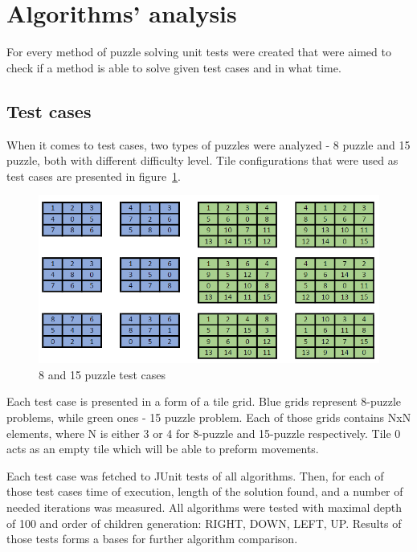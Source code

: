 \documentclass[12pt]{article}
\begin{document}
\section{Algorithms' analysis}

For every method of puzzle solving unit tests were created that were aimed to check if a method is able to solve given test cases and in what time.

\subsection {Test cases}

When it comes to test cases, two types of puzzles were analyzed - 8 puzzle and 15 puzzle, both with different difficulty level. Tile configurations that were used as test cases are presented in figure~\ref{puzzle-test}.

\begin{figure}[h]
    \includegraphics[width=\textwidth]{puzzle_test}
    \centering
    \caption{8 and 15 puzzle test cases}
    \label {puzzle-test}
\end{figure}

Each test case is presented in a form of a tile grid. Blue grids represent 8-puzzle problems, while green ones - 15 puzzle problem. Each of those grids contains NxN elements, where N is either 3 or 4 for 8-puzzle and 15-puzzle respectively. Tile 0 acts as an empty tile which will be able to preform movements. 

Each test case was fetched to JUnit tests of all algorithms. Then, for each of those test cases time of execution, length of the solution found, and a number of needed iterations was measured. All algorithms were tested with maximal depth of 100 and order of children generation:  RIGHT, DOWN, LEFT, UP. Results of those tests forms a bases for further algorithm comparison.
\end{document}
